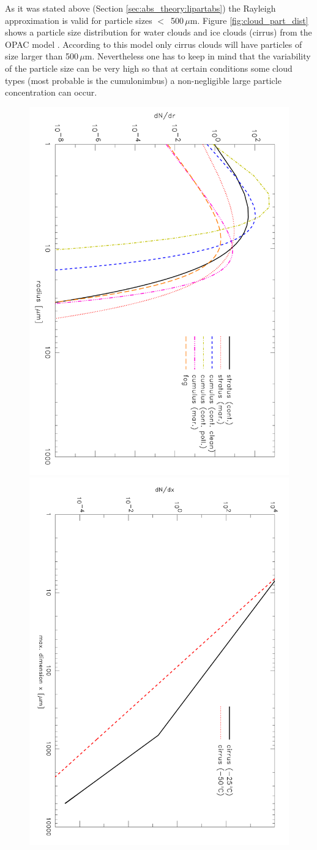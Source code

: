As it was stated above (Section \ref{sec:abs_theory:lipartabs}) the Rayleigh 
approximation is valid for particle sizes $<$~500\,$\mu$m. Figure 
\ref{fig:cloud_part_dist} shows a particle size distribution for water
clouds and ice clouds (cirrus) from the OPAC model \citep{hess:98}. 
According to this model only cirrus clouds will have particles of size
larger than 500\,$\mu$m. Nevertheless one has to keep in mind that the
variability of the particle size can be very high so that at certain 
conditions some cloud types (most probable is the cumulonimbus) 
a non-negligible large particle concentration can occur.

\begin{figure}
  \begin{center}
  \includegraphics*[width=0.6\hsize, angle=90]{LWCcloud}\\
  \includegraphics*[width=0.6\hsize, angle=90]{IWCcloud}

\end{center}
\end{figure}
